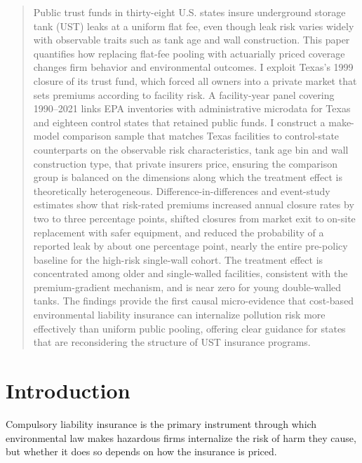 \documentclass[
  12pt,
]{article}
\begin{document}
\begin{quote}
{\small \noindent Public trust funds in thirty-eight U.S. states insure underground storage tank
(UST) leaks at a uniform flat fee, even though leak risk varies widely with observable
traits such as tank age and wall construction. This paper quantifies how replacing
flat-fee pooling with actuarially priced coverage changes firm behavior and environmental
outcomes. I exploit Texas's 1999 closure of its trust fund, which forced all owners into
a private market that sets premiums according to facility risk. A facility-year panel
covering 1990--2021 links EPA inventories with administrative microdata for Texas and
eighteen control states that retained public funds. I construct a make-model comparison
sample that matches Texas facilities to control-state counterparts on the observable risk
characteristics, tank age bin and wall construction type, that private insurers price,
ensuring the comparison group is balanced on the dimensions along which the treatment
effect is theoretically heterogeneous. Difference-in-differences and event-study estimates
show that risk-rated premiums increased annual closure rates by two to three percentage
points, shifted closures from market exit to on-site replacement with safer equipment,
and reduced the probability of a reported leak by about one percentage point, nearly the
entire pre-policy baseline for the high-risk single-wall cohort. The treatment effect is
concentrated among older and single-walled facilities, consistent with the
premium-gradient mechanism, and is near zero for young double-walled tanks. The findings
provide the first causal micro-evidence that cost-based environmental liability insurance
can internalize pollution risk more effectively than uniform public pooling, offering
clear guidance for states that are reconsidering the structure of UST insurance programs.}
\end{quote}

\renewcommand{\thefootnote}{\arabic{footnote}}
\setcounter{footnote}{0}

\newpage

\section{Introduction}\label{introduction}

Compulsory liability insurance is the primary instrument through which
environmental law makes hazardous firms internalize the risk of harm
they cause, but whether it does so depends on how the insurance is
priced.
\end{document}
